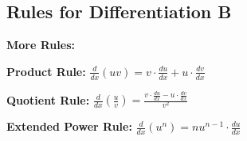 \documentclass[addpoints, 12pt]{exam}
\begin{document}
\subsection*{Rules for Differentiation B}
\noindent\textbf{More Rules:}
\begin{questions}
    \question \textbf{Product Rule:} $\displaystyle\frac{d}{dx}(uv)=v\cdot\frac{du}{dx}+u\cdot\frac{dv}{dx}$
    \question \textbf{Quotient Rule:} $\displaystyle\frac{d}{dx}\left(\frac{u}{v}\right)=\frac{v\cdot\frac{du}{dx}-u\cdot\frac{dv}{dx}}{v^2}$
    \question \textbf{Extended Power Rule:} $\displaystyle\frac{d}{dx}\left(u^n\right)=nu^{n-1}\cdot\frac{du}{dx}$
\end{questions}
\end{document}
